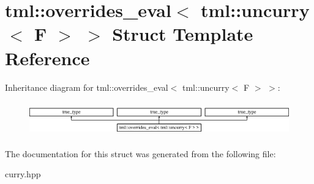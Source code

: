 \hypertarget{structtml_1_1overrides__eval_3_01tml_1_1uncurry_3_01F_01_4_01_4}{\section{tml\+:\+:overrides\+\_\+eval$<$ tml\+:\+:uncurry$<$ F $>$ $>$ Struct Template Reference}
\label{structtml_1_1overrides__eval_3_01tml_1_1uncurry_3_01F_01_4_01_4}
}
Inheritance diagram for tml\+:\+:overrides\+\_\+eval$<$ tml\+:\+:uncurry$<$ F $>$ $>$\+:\begin{figure}[H]
\begin{center}
\leavevmode
\includegraphics[height=1.505376cm]{structtml_1_1overrides__eval_3_01tml_1_1uncurry_3_01F_01_4_01_4}
\end{center}
\end{figure}


The documentation for this struct was generated from the following file\+:\begin{DoxyCompactItemize}
\item 
curry.\+hpp\end{DoxyCompactItemize}
